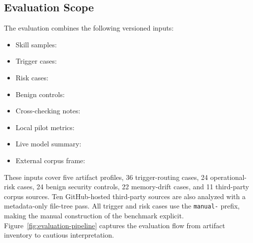 \documentclass[11pt]{article}
\begin{document}
\subsection{Evaluation Scope}

The evaluation combines the following versioned inputs:
\begin{itemize}[leftmargin=*]
    \item Skill samples: 
    \item Trigger cases: 
    \item Risk cases: 
    \item Benign controls: 
    \item Cross-checking notes: 
    \item Local pilot metrics: 
    \item Live model summary: 
    \item External corpus frame:
\end{itemize}

These inputs cover five artifact profiles, 36 trigger-routing cases, 24
operational-risk cases, 24 benign security controls, 22 memory-drift cases, and
11 third-party corpus sources. Ten GitHub-hosted third-party sources are also
analyzed with a metadata-only file-tree pass. All trigger and risk cases use
the \texttt{manual-} prefix, making the manual construction of the benchmark
explicit. Figure~\ref{fig:evaluation-pipeline} captures the
evaluation flow from artifact inventory to cautious interpretation.
\end{document}
